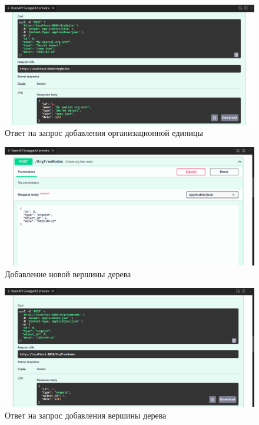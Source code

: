 \begin{figure}
    \includegraphics[scale=0.2]{img/swagger4.png}
    \caption{Ответ на запрос добавления организационной единицы}
    \label{swagger4}
\end{figure}

\begin{figure}
    \includegraphics[scale=0.2]{img/swagger5.png}
    \caption{Добавление новой вершины дерева}
    \label{swagger5}
\end{figure}

\begin{figure}
    \includegraphics[scale=0.2]{img/swagger6.png}
    \caption{Ответ на запрос добавления вершины дерева}
    \label{swagger6}
\end{figure}

